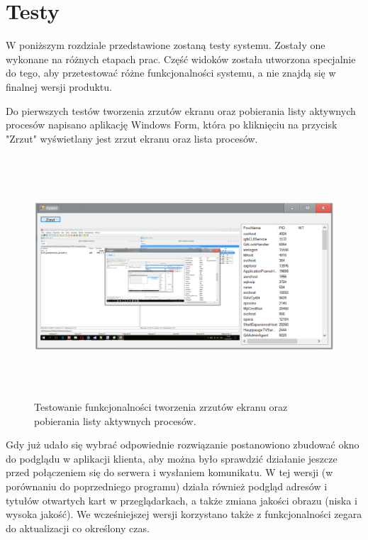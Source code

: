 \section{Testy}

W poniższym rozdziale przedstawione zostaną testy systemu. Zostały one wykonane na różnych etapach prac. Część widoków została utworzona specjalnie do tego, aby przetestować różne funkcjonalności systemu, a nie znajdą się w finalnej wersji produktu.

\newline \newline
Do pierwszych testów tworzenia zrzutów ekranu oraz pobierania listy aktywnych procesów napisano aplikację Windows Form, która po kliknięciu na przycisk "Zrzut" wyświetlany jest zrzut ekranu oraz lista procesów.

\begin{figure} [!ht]
    \centering
    \includegraphics[height=9cm,width=16cm]{comspy_testy1}
    \caption{Testowanie funkcjonalności tworzenia zrzutów ekranu oraz pobierania listy aktywnych procesów.}
    \label{fig:my_label}
\end{figure}

\newpage
Gdy już udało się wybrać odpowiednie rozwiązanie postanowiono zbudować okno do podglądu w aplikacji klienta, aby można było sprawdzić działanie jeszcze przed połączeniem się do serwera i wysłaniem komunikatu. W tej wersji (w porównaniu do poprzedniego programu) działa również podgląd adresów i tytułów otwartych kart w przeglądarkach, a także zmiana jakości obrazu (niska i wysoka jakość). We wcześniejszej wersji korzystano także z funkcjonalności zegara do aktualizacji co określony czas.


